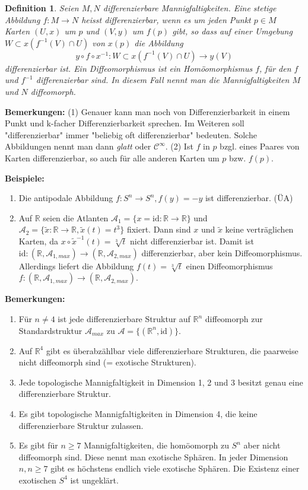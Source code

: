 \documentclass[12pt,a4paper]{article}
\def\R{\mathbb{R}}
\def\id{\mathrm{id}}
\newtheorem{Definition}[Lemma]{Definition}
\begin{document}
\begin{Definition}
Seien $M, N$ differenzierbare Mannigfaltigkeiten. Eine stetige Abbildung $f:M\rightarrow N$ heisst
{\em differenzierbar}, wenn es um jeden Punkt $p\in M$ Karten $(U,x)$ um $p$ und $(V,y)$ um $f(p)$
gibt, so dass auf einer Umgebung $W \subset x(f^{-1}(V)\cap U)$ von $x(p)$ die Abbildung
$$
y \circ f \circ x^{-1} : W \subset x(f^{-1}(V)\cap U) \rightarrow y(V)
$$
differenzierbar ist. Ein {\em Diffeomorphismus} ist ein Hom\"oomorphismus $f$, f\"ur den $f$ und
$f^{-1}$ differenzierbar sind. In diesem Fall nennt man die Mannigfaltigkeiten $M$ und $N$
{\em diffeomorph}.
\end{Definition}

\medskip

{\bf Bemerkungen:}
(1) Genauer kann man noch von Differenzierbarkeit in einem Punkt und k-facher Differenzierbarkeit sprechen.
Im Weiteren soll "differenzierbar" immer "beliebig oft differenzierbar" bedeuten. Solche Abbildungen nennt
man dann {\it glatt} oder $\mathcal C^\infty$. (2) Ist $f$ in $p$ bzgl. eines Paares von Karten differenzierbar,
so auch f\"ur alle anderen Karten um $p$ bzw. $f(p)$.

\bigskip

{\bf Beispiele:}
\begin{enumerate}
\item Die antipodale Abbildung $f: S^n\rightarrow S^n, f(y)=-y$ ist differenzierbar. (\"UA)
\item   Auf $\R$ seien die Atlanten $\mathcal A_1 = \{x=\id:\R \rightarrow \R\}$ und
$\mathcal A_2 = \{\tilde x :\R \rightarrow \R, \tilde x(t) = t^3\}$ fixiert. Dann sind
$x$  und $\tilde x$ keine vertr\"aglichen Karten, da $x\circ \tilde x^{-1}(t) = \sqrt[3]{t}$
nicht differenzierbar ist. Damit ist $\id : (\R, \mathcal A_{1,max})\rightarrow (\R, \mathcal A_{2,max})$
differenzierbar, aber kein Diffeomorphismus. Allerdings liefert die Abbildung $f(t) = \sqrt[3]{t}$
einen Diffeomorphismus $f:(\R, \mathcal A_{1,max})\rightarrow (\R, \mathcal A_{2,max})$.
\end{enumerate}

\bigskip

{\bf Bemerkungen:}
\begin{enumerate}
\item F\"ur $n\neq 4$ ist jede differenzierbare Struktur auf $\R^n$ diffeomorph zur Standardstruktur
$\mathcal A_{max}$ zu $\mathcal A = \{(\R^n, \id)\}$.
\item Auf $\R^4$ gibt es \"uberabz\"ahlbar viele differenzierbare Strukturen, die paarweise nicht diffeomorph
sind (= exotische Strukturen).
\item Jede topologische Mannigfaltigkeit in Dimension 1, 2 und 3 besitzt genau eine differenzierbare
Struktur.
\item Es gibt topologische Mannigfaltigkeiten in Dimension 4, die keine differenzierbare Struktur zulassen.
\item Es gibt f\"ur $n\geq7$ Mannigfaltigkeiten, die hom\"oomorph zu $S^n$ aber nicht diffeomorph sind.
Diese nennt man exotische Sph\"aren. In jeder Dimension $n, n\ge 7$ gibt es h\"ochstens endlich viele exotische Sph\"aren.
Die Existenz einer exotischen $S^4$ ist ungekl\"art.
\end{enumerate}
\end{document}
